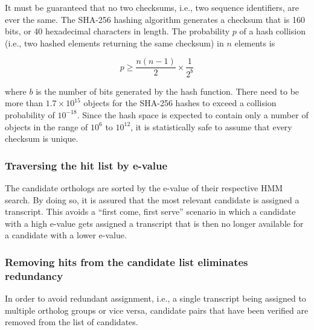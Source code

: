 It must be guaranteed that no two checksums, i.e., two sequence identifiers, are
ever the same. The SHA-256 hashing algorithm generates a checksum that is 160 bits,
or 40 hexadecimal characters in length. The probability $p$ of a hash collision
(i.e., two hashed elements returning the same checksum) in $n$ elements is

\begin{equation}
p \ge \frac{n (n-1)}{2} \times \frac{1}{2^b}
\label{eq:hashcollision}
\end{equation}

where $b$ is the number of bits generated by the hash function. There need to be
more than $1.7 \times 10^{15}$ objects for the SHA-256 hashes to exceed a collision
probability of $10^{-18}$. Since the hash space is expected to contain only a
number of objects in the range of $10^6$ to $10^{12}$, it is statistically safe
to assume that every checksum is unique. 

\subsubsection{Traversing the hit list by e-value}

The candidate orthologs are sorted by the e-value of their respective HMM
search. By doing so, it is assured that the most relevant candidate is assigned
a transcript. This avoids a ``first come, first serve'' scenario in which a
candidate with a high e-value gets assigned a transcript that is then no longer
available for a candidate with a lower e-value.

\subsubsection{Removing hits from the candidate list eliminates redundancy}

In order to avoid redundant assignment, i.e., a single transcript being assigned
to multiple ortholog groups or vice versa, candidate pairs that have been
verified are removed from the list of candidates. 

